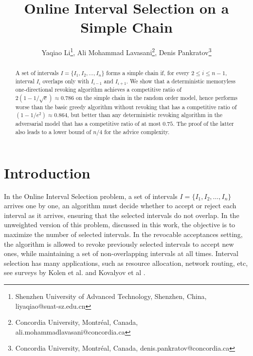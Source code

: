 \documentclass[reqno,11pt]{article} %
\theoremstyle{remark}
\begin{document}
\title{Online Interval Selection on a Simple Chain}

\author{
Yaqiao Li\footnote{Shenzhen University of Advanced Technology, Shenzhen, China, liyaqiao@suat-sz.edu.cn},
Ali Mohammad Lavasani\footnote{Concordia University, Montr{\'e}al, Canada, ali.mohammadlavasani@concordia.ca},
Denis Pankratov\footnote{Concordia University, Montr{\'e}al, Canada, denis.pankratov@concordia.ca}}




\maketitle


\begin{abstract}
A set of intervals $I = \{ I_1, I_2, \dots, I_n \}$ forms a simple chain if, for every $2\leq i \leq n-1$, interval $I_i$ overlaps only with $I_{i-1}$ and $I_{i+1}$.  
We show that a  deterministic memoryless one-directional revoking algorithm achieves a competitive ratio of $2(1 - 1/\sqrt{e}) \approx 0.786$ on the simple chain in the random order model, hence performs worse than the basic greedy algorithm without revoking that has a competitive ratio of $(1 - 1/e^2) \approx 0.864$, but better than any deterministic revoking algorithm in the adversarial model that has a competitive ratio of at most $0.75$. The proof of the latter also leads to a lower bound of $n/4$ for the advice complexity. 
\end{abstract}




\section{Introduction}

In the Online Interval Selection problem, a set of intervals $I = \{ I_1, I_2, \dots, I_n \}$ arrives one by one, an algorithm must decide whether to accept or reject each interval as it arrives, ensuring that the selected intervals do not overlap. 
In the unweighted version of this problem, discussed in this work, the objective is to maximize the number of selected intervals. In the revocable acceptances setting, the algorithm is allowed to revoke previously selected intervals to accept new ones, while maintaining a set of non-overlapping intervals at all times. 
Interval selection has many applications, such as resource allocation, network routing,  etc, see surveys by
Kolen et al. \cite{kolen2007interval} and Kovalyov et al \cite{kovalyov2007fixed}. 
\end{document}
